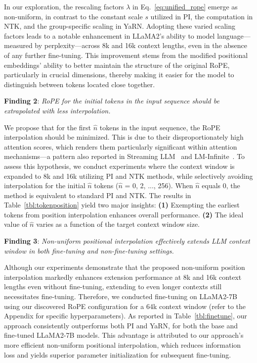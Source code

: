 In our exploration, the rescaling factors $\lambda$ in Eq.~\ref{eq:unified_rope} emerge as non-uniform, in contrast to the constant scale $s$ utilized in PI, the computation in NTK, and the group-specific scaling in YaRN. Adopting these varied scaling factors leads to a notable enhancement in LLaMA2's ability to model language—measured by perplexity—across 8k and 16k context lengths, even in the absence of any further fine-tuning. This improvement stems from the modified positional embeddings' ability to better maintain the structure of the original RoPE, particularly in crucial dimensions, thereby making it easier for the model to distinguish between tokens located close together.

\textbf{Finding 2}: \textit{RoPE for the initial tokens in the input sequence should be extrapolated with less interpolation.} 

We propose that for the first $\hat{n}$ tokens in the input sequence, the RoPE interpolation should be minimized. This is due to their disproportionately high attention scores, which renders them particularly significant within attention mechanisms—a pattern also reported in Streaming LLM~\cite{streamingllm} and LM-Infinite~\cite{han2023lminfinite}. To assess this hypothesis, we conduct experiments where the context window is expanded to 8k and 16k utilizing PI and NTK methods, while selectively avoiding interpolation for the initial $\hat n$ tokens ($\hat n$ = 0, 2, ..., 256). When $\hat n$ equals 0, the method is equivalent to standard PI and NTK. The results in Table~\ref{tbl:tokenposition} yield two major insights: \textbf{(1)} Exempting the earliest tokens from position interpolation enhances overall performance. \textbf{(2)} The ideal value of $\hat n$ varies as a function of the target context window size.

\textbf{Finding 3}: \textit{Non-uniform positional interpolation effectively extends LLM context window in both fine-tuning and non-fine-tuning settings.} 

Although our experiments demonstrate that the proposed non-uniform position interpolation markedly enhances extension performance at 8k and 16k context lengths even without fine-tuning, extending to even longer contexts still necessitates fine-tuning. Therefore, we conducted fine-tuning on LLaMA2-7B using our discovered RoPE configuration for a 64k context window (refer to the Appendix for specific hyperparameters). As reported in Table~\ref{tbl:finetune}, our approach consistently outperforms both PI and YaRN, for both the base and fine-tuned LLaMA2-7B models. This advantage is attributed to our approach’s more efficient non-uniform positional interpolation, which reduces information loss and yields superior parameter initialization for subsequent fine-tuning.

